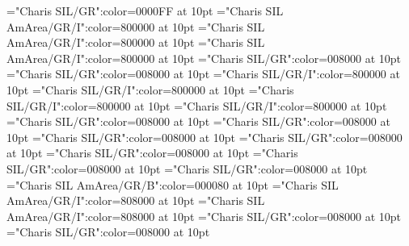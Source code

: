 \documentclass[a4paper,twoside]{article}
\begin{document}
\font\headwordspanspanspanspanminorentryvariantletDatadicBody="Charis SIL/GR":color=0000FF at 10pt
\font\spanmxbheadwordspanspanspanspanminorentryvariantletDatadicBody="Charis SIL AmArea/GR/I":color=800000 at 10pt
\font\spanheadwordreferencedentryreferencedentriesvisiblevariantentryrefsminorentryvariantspanmxbheadwordspanspanspanspanminorentryvariantletDatadicBody="Charis SIL AmArea/GR/I":color=800000 at 10pt
\font\spanheadwordreferencedentryreferencedentriesvisiblevariantentryrefsminorentryvariantheadwordspanspanspanspanminorentryvariantletDatadicBody="Charis SIL AmArea/GR/I":color=800000 at 10pt
\font\spanesspanminorentryvariantletDatadicBody="Charis SIL/GR":color=008000 at 10pt
\font\spanspanesspanminorentryvariantletDatadicBody="Charis SIL/GR":color=008000 at 10pt
\font\partofspeechspansensespanspanentryletDatadicBody="Charis SIL/GR/I":color=800000 at 10pt
\font\spanespartofspeechspansensespanspanentryletDatadicBody="Charis SIL/GR/I":color=800000 at 10pt
\font\spanpartofspeechmorphosyntaxanalysissensesensecontentsensesentryspanespartofspeechspansensespanspanentryletDatadicBody="Charis SIL/GR/I":color=800000 at 10pt
\font\spanpartofspeechmorphosyntaxanalysissensesensecontentsensesentrypartofspeechspansensespanspanentryletDatadicBody="Charis SIL/GR/I":color=800000 at 10pt
\font\spanesspansensespanspanentryletDatadicBody="Charis SIL/GR":color=008000 at 10pt
\font\spandefinitionsensesensecontentsensesentryspanesspansensespanspanentryletDatadicBody="Charis SIL/GR":color=008000 at 10pt
\font\spandefinitionsensesensecontentsensesentryspansensespanspanentryletDatadicBody="Charis SIL/GR":color=008000 at 10pt
\font\pictureentryentryletDatadicBody="Charis SIL/GR":color=008000 at 10pt
\font\pictureentrypictureentryentryletDatadicBody="Charis SIL/GR":color=008000 at 10pt
\font\captionContentpictureentryentryletDatadicBody="Charis SIL/GR":color=008000 at 10pt
\font\spancaptionContentpictureentryentryletDatadicBody="Charis SIL/GR":color=008000 at 10pt
\font\spanmxbspancaptionContentpictureentryentryletDatadicBody="Charis SIL AmArea/GR/B":color=000080 at 10pt
\font\comentariorestrictivosensesensecontentsensesmainentrycomplexsensespanspanentryletDatadicBody="Charis SIL AmArea/GR/I":color=808000 at 10pt
\font\spancomentariorestrictivosensesensecontentsensesmainentrycomplexsensespanspanentryletDatadicBody="Charis SIL AmArea/GR/I":color=808000 at 10pt
\font\spanescomentariorestrictivosensesensecontentsensesmainentrycomplexsensespanspanentryletDatadicBody="Charis SIL/GR":color=008000 at 10pt
\font\mainentrysubsensessensessensespanspanentryletDatadicBody="Charis SIL/GR":color=008000 at 10pt
\end{document}
